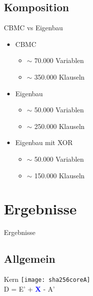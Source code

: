 \documentclass{beamer}
\begin{document}
  \subsection{Komposition}
  \begin{frame}{CBMC vs Eigenbau}
    \begin{itemize}
      \item CBMC
      \begin{itemize}
        \item $ \sim $ 70.000 Variablen
        \item $ \sim $ 350.000 Klauseln
      \end{itemize}
      \item Eigenbau
      \begin{itemize}
        \item $ \sim $ 50.000 Variablen
        \item $ \sim $ 250.000 Klauseln
      \end{itemize}
      \item Eigenbau mit XOR
      \begin{itemize}
        \item $ \sim $ 50.000 Variablen
        \item $ \sim $ 150.000 Klauseln
      \end{itemize}
    \end{itemize}
  \end{frame}

\section{Ergebnisse}
  \begin{frame}{}
    \begin{center}
      \Huge Ergebnisse
    \end{center}
  \end{frame}
  \subsection{Allgemein}
    \begin{frame}{Kern}
      \texttt{[image: sha256coreA]}\\
      D = E' + \textcolor{blue}{\textbf{X}} - A'\\
    \end{frame}
\end{document}

